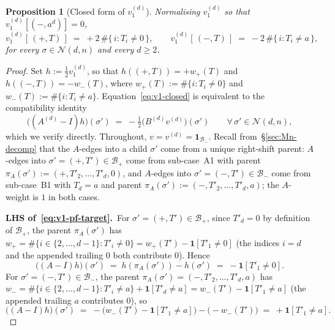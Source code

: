 \documentclass{amsart}
\newtheorem{proposition}[theorem]{Proposition}
\theoremstyle{definition}
\theoremstyle{remark}
\begin{document}
\begin{proposition}[Closed form of $v_1^{(d)}$]
\label{prop:v1-closed}
Normalising $v^{(d)}_1$ so that $v^{(d)}_1[(-, a^d)] = 0$,
\begin{equation}\label{eq:v1-closed}
  v^{(d)}_1[\,(+, T)\,] \;=\; +2 \, \#\{\,i : T_i \ne 0\,\},
  \qquad
  v^{(d)}_1[\,(-, T)\,] \;=\; -2 \, \#\{\,i : T_i \ne a\,\},
\end{equation}
for every $\sigma \in \mathcal{N}(d, n)$ and every $d \ge 2$.
\end{proposition}

\begin{proof}
Set $h := \tfrac{1}{2} v^{(d)}_1$, so that
$h((+, T)) = +w_+(T)$ and $h((-, T)) = -w_-(T)$, where
$w_+(T) := \#\{i : T_i \ne 0\}$ and
$w_-(T) := \#\{i : T_i \ne a\}$.  Equation~\eqref{eq:v1-closed}
is equivalent to the compatibility identity
\begin{equation}\label{eq:v1-pf-target}
  \bigl((A^{(d)} - I) h\bigr)(\sigma') \;=\; -\tfrac{1}{2}
    \bigl(B^{(d)} v^{(d)}\bigr)(\sigma')
  \qquad \forall\, \sigma' \in \mathcal{N}(d, n),
\end{equation}
which we verify directly.  Throughout, $v = v^{(d)} =
\mathbf{1}_{\mathcal{B}_-}$.  Recall from~\S\ref{sec:Mn-decomp}
that the $A$-edges into a child $\sigma'$ come from a unique
right-shift parent: $A$-edges into $\sigma' = (+, T') \in
\mathcal{B}_+$ come from sub-case~A1 with parent
$\pi_A(\sigma') := (+, T'_2, \ldots, T'_d, 0)$, and $A$-edges into
$\sigma' = (-, T') \in \mathcal{B}_-$ come from sub-case~B1 with
$T_d = a$ and parent $\pi_A(\sigma') := (-, T'_2, \ldots, T'_d,
a)$; the $A$-weight is $1$ in both cases.

\smallskip\noindent\textbf{LHS of~\eqref{eq:v1-pf-target}.}\
For $\sigma' = (+, T') \in \mathcal{B}_+$, since $T'_d = 0$ by
definition of $\mathcal{B}_+$, the parent $\pi_A(\sigma')$ has
$w_+ = \#\{i \in \{2, \ldots, d-1\} : T'_i \ne 0\} = w_+(T') -
\mathbf{1}[T'_1 \ne 0]$ (the indices $i = d$ and the appended
trailing $0$ both contribute $0$).  Hence
\begin{equation}\label{eq:v1-pf-LHS-plus}
  \bigl((A - I) h\bigr)(\sigma') \;=\; h(\pi_A(\sigma')) - h(\sigma')
    \;=\; -\mathbf{1}[T'_1 \ne 0].
\end{equation}
For $\sigma' = (-, T') \in \mathcal{B}_-$, the parent
$\pi_A(\sigma') = (-, T'_2, \ldots, T'_d, a)$ has
$w_- = \#\{i \in \{2, \ldots, d-1\} : T'_i \ne a\} +
\mathbf{1}[T'_d \ne a] = w_-(T') - \mathbf{1}[T'_1 \ne a]$
(the appended trailing $a$ contributes $0$), so
\begin{equation}\label{eq:v1-pf-LHS-minus}
  \bigl((A - I) h\bigr)(\sigma') \;=\; -\bigl(w_-(T') -
    \mathbf{1}[T'_1 \ne a]\bigr) - \bigl(-w_-(T')\bigr)
    \;=\; +\mathbf{1}[T'_1 \ne a].
\end{equation}


\end{proof}
\end{document}
